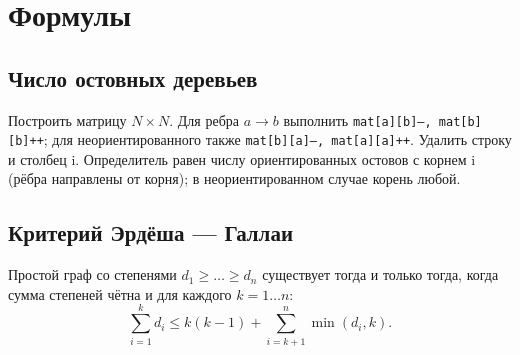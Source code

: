 \section{Формулы}
	\subsection{Число остовных деревьев}
		Построить матрицу $N\times N$. Для ребра $a\to b$ выполнить
		\texttt{mat[a][b]--, mat[b][b]++}; для неориентированного также
		\texttt{mat[b][a]--, mat[a][a]++}. Удалить строку и столбец i.
		Определитель равен числу ориентированных остовов с корнем i
		(рёбра направлены от корня); в неориентированном случае корень любой.

	\subsection{Критерий Эрдёша — Галлаи}
		Простой граф со степенями $d_1\ge\dots\ge d_n$ существует тогда и только тогда, когда сумма степеней чётна и для каждого $k=1\dots n$:
		\[ \sum _{i=1}^{k}d_{i}\leq k(k-1)+\sum _{i=k+1}^{n}\min(d_{i},k). \]

